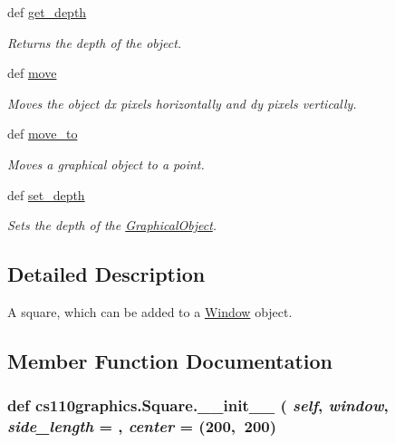 \begin{DoxyCompactItemize}
def \hyperlink{classcs110graphics_1_1GraphicalObject_a6d9f5718cd0cf249e0d2842971bae17f}{get\_\-depth}
\begin{DoxyCompactList}\small\item\em Returns the depth of the object. \item\end{DoxyCompactList}\item 
def \hyperlink{classcs110graphics_1_1GraphicalObject_aa64d270fb83efa4a54e1a7953512f9cd}{move}
\begin{DoxyCompactList}\small\item\em Moves the object dx pixels horizontally and dy pixels vertically. \item\end{DoxyCompactList}\item 
def \hyperlink{classcs110graphics_1_1GraphicalObject_abe2d480265df7ac9447205c52c6946df}{move\_\-to}
\begin{DoxyCompactList}\small\item\em Moves a graphical object to a point. \item\end{DoxyCompactList}\item 
def \hyperlink{classcs110graphics_1_1GraphicalObject_a20d76d4ee4419c3065d61deb6cbc6700}{set\_\-depth}
\begin{DoxyCompactList}\small\item\em Sets the depth of the \hyperlink{classcs110graphics_1_1GraphicalObject}{GraphicalObject}. \item\end{DoxyCompactList}\end{DoxyCompactItemize}


\subsection{Detailed Description}
A square, which can be added to a \hyperlink{classcs110graphics_1_1Window}{Window} object. 

\subsection{Member Function Documentation}
\hypertarget{classcs110graphics_1_1Square_ae4b847029070a73478fd7dd2eefeb58e}{
\subsubsection[{\_\-\_\-init\_\-\_\-}]{\setlength{\rightskip}{0pt plus 5cm}def cs110graphics.Square.\_\-\_\-init\_\-\_\- ( {\em self}, \/   {\em window}, \/   {\em side\_\-length} = {}, \/   {\em center} = {\ttfamily (200,~200})}}
\label{classcs110graphics_1_1Square_ae4b847029070a73478fd7dd2eefeb58e}

